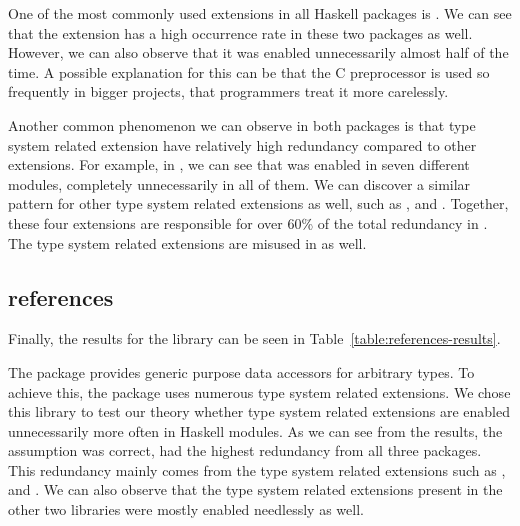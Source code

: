 \documentclass[main.tex]{subfiles}
\begin{document}
	One of the most commonly used extensions in all Haskell packages is . We can see that the extension has a high occurrence rate in these two packages as well. However, we can also observe that it was enabled unnecessarily almost half of the time. A possible explanation for this can be that the C preprocessor is used so frequently in bigger projects, that programmers treat it more carelessly.
	
	
	Another common phenomenon we can observe in both packages is that type system related extension have relatively high redundancy compared to other extensions. For example, in , we can see that  was enabled in seven different modules, completely unnecessarily in all of them. We can discover a similar pattern for other type system related extensions as well, such as ,  and . Together, these four extensions are responsible for over 60\% of the total redundancy in . The type system related extensions are misused in  as well.
	
	\subsection{references}
	
	Finally, the results for the  library can be seen in Table~\ref{table:references-results}.
	
	The  package provides generic purpose data accessors for arbitrary types. To achieve this, the package uses numerous type system related extensions.	We chose this library to test our theory whether type system related extensions are enabled unnecessarily more often in Haskell modules. As we can see from the results, the assumption was correct,  had the highest redundancy from all three packages. This redundancy mainly comes from the type system related extensions such as ,  and . We can also observe that the type system related extensions present in the other two libraries were mostly enabled needlessly as well.
	
\end{document}
